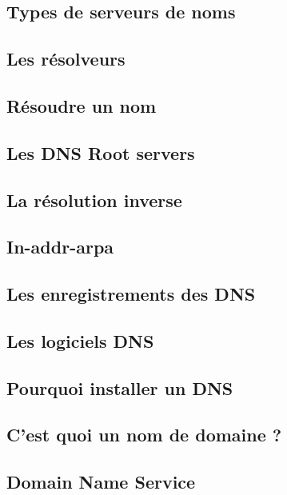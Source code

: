 \documentclass[12pt]{article}
\begin{document}
\subsection{Types de serveurs de noms}


\subsection{Les résolveurs}


\subsection{Résoudre un nom}


\subsection{Les DNS Root servers}


\subsection{La résolution inverse}


\subsection{In-addr-arpa}


\subsection{Les enregistrements des DNS}


\subsection{Les logiciels DNS}


\subsection{Pourquoi installer un DNS}


\subsection{C’est quoi un nom de domaine ?}


\subsection{Domain Name Service}
\end{document}

